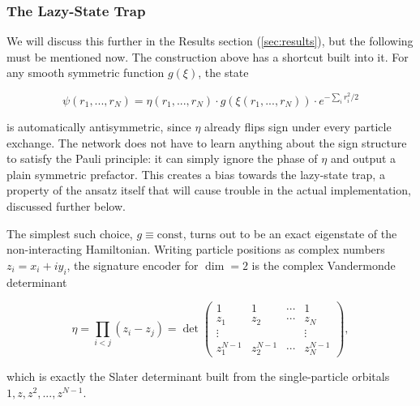 \documentclass[a4paper,11pt,twoside]{article}
\begin{document}
\subsubsection{The Lazy-State Trap}
\label{sec:lazy_trap}

We will discuss this further in the Results section (\ref{sec:results}), but the following must be mentioned now. The construction above has a shortcut built into it. For any smooth symmetric function $g(\xi)$, the state

\begin{equation}
    \psi(r_1,...,r_N) = \eta(r_1,...,r_N) \cdot g(\xi(r_1,...,r_N)) \cdot e^{-\sum_i r_i^2/2}
\end{equation}

is automatically antisymmetric, since $\eta$ already flips sign under every particle exchange. The network does not have to learn anything about the sign structure to satisfy the Pauli principle: it can simply ignore the phase of $\eta$ and output a plain symmetric prefactor. This creates a bias towards the lazy-state trap, a property of the ansatz itself that will cause trouble in the actual implementation, discussed further below.

The simplest such choice, $g \equiv \text{const}$, turns out to be an exact eigenstate of the non-interacting Hamiltonian. Writing particle positions as complex numbers $z_i = x_i + i y_i$, the signature encoder for $\dim=2$ is the complex Vandermonde determinant

\begin{equation}
    \eta = \prod_{i<j} (z_i - z_j) = \det \begin{pmatrix} 1 & 1 & \cdots & 1 \\ z_1 & z_2 & \cdots & z_N \\ \vdots & & & \vdots \\ z_1^{N-1} & z_2^{N-1} & \cdots & z_N^{N-1} \end{pmatrix},
\end{equation}

which is exactly the Slater determinant built from the single-particle orbitals $1, z, z^2, ..., z^{N-1}$.
\end{document}
